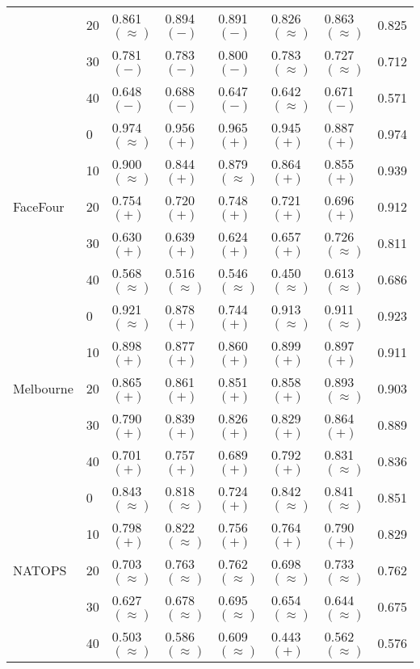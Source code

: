 \documentclass{llncs}
\begin{document}
\begin{table*}[th!]
\begin{tabular*}{\linewidth}{l @{\extracolsep{\fill}} l l l l l l l}
    & 20 & 0.861 $(\approx)$ & 0.894 $(-)$ & 0.891 $(-)$ &0.826 $(\approx)$ &0.863 $(\approx)$ & 0.825 \\
    & 30 & 0.781 $(-)$ & 0.783 $(-)$ & 0.800 $(-)$ & 0.783 $(\approx)$ & 0.727 $(\approx)$ & 0.712 \\
    & 40 & 0.648 $(-)$ & 0.688 $(-)$ & 0.647 $(-)$ & 0.642 $(\approx)$ & 0.671 $(-)$ & 0.571\\
    \midrule
    \multirow{5}{0.13\linewidth}{FaceFour}
    & 0 & 0.974 $(\approx)$ & 0.956 $(+)$ & 0.965 $(+)$ & 0.945 $(+)$ & 0.887 $(+)$ & 0.974 \\
    & 10 & 0.900 $(\approx)$ & 0.844 $(+)$ & 0.879 $(\approx)$ & 0.864 $(+)$ & 0.855 $(+)$ & 0.939\\
    & 20 & 0.754 $(+)$ & 0.720 $(+)$ & 0.748 $(+)$ & 0.721 $(+)$ & 0.696 $(+)$ & 0.912\\
    & 30 & 0.630 $(+)$ & 0.639 $(+)$ & 0.624 $(+)$ & 0.657 $(+)$ & 0.726 $(\approx)$ & 0.811\\
    & 40 & 0.568 $(\approx)$ & 0.516 $(\approx)$ & 0.546 $(\approx)$ & 0.450 $(\approx)$ & 0.613 $(\approx)$ & 0.686\\
    \midrule
    \multirow{5}{0.13\linewidth}{Melbourne}
    & 0 & 0.921 $(\approx)$ & 0.878 $(+)$ & 0.744 $(+)$ & 0.913 $(\approx)$ & 0.911 $(\approx)$ & 0.923\\
    & 10 & 0.898 $(+)$ & 0.877 $(+)$ & 0.860 $(+)$ & 0.899 $(+)$ & 0.897 $(+)$ & 0.911\\
    & 20 & 0.865 $(+)$ & 0.861 $(+)$ & 0.851 $(+)$ & 0.858 $(+)$ & 0.893 $(\approx)$ & 0.903\\
    & 30 & 0.790 $(+)$ & 0.839 $(+)$ & 0.826 $(+)$ & 0.829 $(+)$ & 0.864 $(+)$ & 0.889\\
    & 40 & 0.701 $(+)$ & 0.757 $(+)$ & 0.689 $(+)$ & 0.792 $(+)$ & 0.831 $(\approx)$ & 0.836\\
    \midrule
    \multirow{5}{0.13\linewidth}{NATOPS}
    & 0 & 0.843 $(\approx)$ & 0.818 $(\approx)$ & 0.724 $(+)$ & 0.842 $(\approx)$ & 0.841 $(\approx)$ & 0.851\\
    & 10 & 0.798 $(+)$ & 0.822 $(\approx)$ & 0.756 $(+)$ & 0.764 $(+)$ & 0.790 $(+)$ & 0.829\\
    & 20 & 0.703 $(\approx)$ & 0.763 $(\approx)$ & 0.762 $(\approx)$ & 0.698 $(\approx)$ & 0.733 $(\approx)$ & 0.762\\
    & 30 & 0.627 $(\approx)$ & 0.678 $(\approx)$ & 0.695 $(\approx)$ & 0.654 $(\approx)$ & 0.644 $(\approx)$ & 0.675\\
    & 40 & 0.503 $(\approx)$ & 0.586 $(\approx)$ & 0.609 $(\approx)$ & 0.443 $(+)$ & 0.562 $(\approx)$ & 0.576\\

\end{tabular*}
\end{table*}
\end{document}
